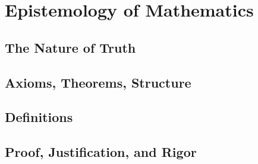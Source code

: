 \documentclass[../../../main/main.tex]{subfiles}
\begin{document}
\chapter{Epistemology of Mathematics}

\section{The Nature of Truth}

\section{Axioms, Theorems, Structure}

\section{Definitions}

\section{Proof, Justification, and Rigor}
\end{document}
